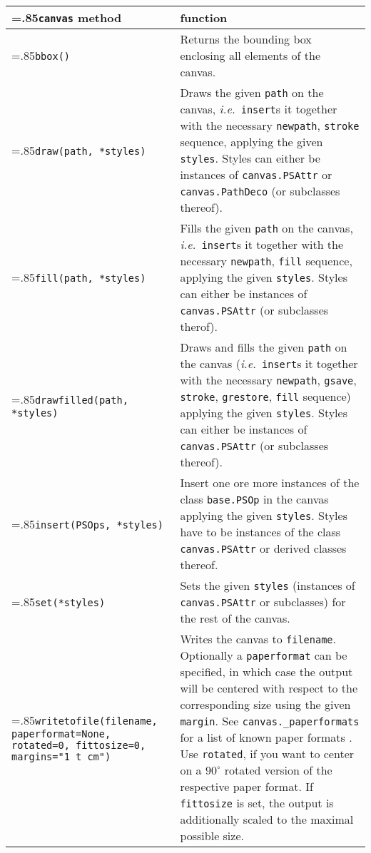 \medskip
\begin{tabularx}
  {\linewidth}
  {>{\hsize=.85\hsize}X>{\raggedright\arraybackslash\hsize=1.15\hsize}X}
  \texttt{canvas} method & function \\
  \hline
  \texttt{bbox()} &
  Returns the bounding box enclosing all elements of the canvas.\\
  \texttt{draw(path, *styles)} & 
  Draws the given \texttt{path} on the canvas, \textit{i.e.}\
  \texttt{insert}s it together with the necessary \texttt{newpath},
  \texttt{stroke} sequence, applying the given \texttt{styles}. Styles
  can either be instances of \texttt{canvas.PSAttr} or
  \texttt{canvas.PathDeco}
  (or subclasses thereof).\\
  \texttt{fill(path, *styles)} &
  Fills the given \texttt{path} on the canvas, \textit{i.e.}\
  \texttt{insert}s it together with the necessary \texttt{newpath},
  \texttt{fill} sequence, applying the given \texttt{styles}. Styles can
  either be instances of \texttt{canvas.PSAttr} (or subclasses therof).\\
  \texttt{drawfilled(path, *styles)} &
  Draws and fills the given \texttt{path} on the canvas (\textit{i.e.}\
  \texttt{insert}s it together with the necessary \texttt{newpath},
  \texttt{gsave}, \texttt{stroke}, \texttt{grestore}, \texttt{fill} sequence)
  applying the given \texttt{styles}. Styles can either be instances of
  \texttt{canvas.PSAttr} (or subclasses thereof).\\
  \texttt{insert(PSOps, *styles)} &
  Insert one ore more instances of the class \texttt{base.PSOp} in the
  canvas applying the given \texttt{styles}.  Styles have to be instances
  of the class \texttt{canvas.PSAttr} or derived classes thereof.\\
  \texttt{set(*styles)} &
  Sets the given \texttt{styles} (instances of \texttt{canvas.PSAttr} or
  subclasses) for the rest of the canvas.\\
    \texttt{writetofile(filename, 
      \newline\phantom{writetofile(}paperformat=None, 
      \newline\phantom{writetofile(}rotated=0,
      \newline\phantom{writetofile(}fittosize=0, 
      \newline\phantom{writetofile(}margins="1 t cm")} &
  Writes the canvas to \texttt{filename}. Optionally a
  \texttt{paperformat} can be specified, in which case the output will
  be centered with respect to the corresponding size using the given
  \texttt{margin}. See \texttt{canvas.\_paperformats} for a list of
  known paper formats . Use \texttt{rotated}, if you want to center on
  a $90^\circ$ rotated version of the respective paper format. If
  \texttt{fittosize} is set, the output is additionally scaled to the
  maximal possible size.
\end{tabularx} 
\medskip








